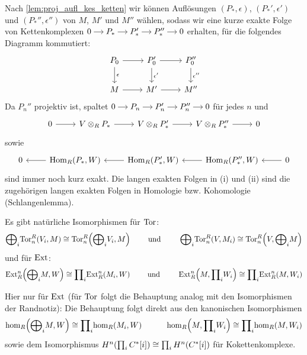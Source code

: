 \begin{beweis}
	Nach \autoref{lem:proj_aufl_kes_ketten} wir können Auflösungen $(P_*,\epsilon)$, $(P_*',\epsilon')$ und $(P_*'',\epsilon'')$ von $M$, $M'$ und $M''$ wählen, sodass wir eine kurze exakte Folge von Kettenkomplexen
	\(
		\begin{tikzcd}[cramped,sep=small]
			0 \rar & P_* \rar & P_*' \rar & P_*'' \rar & 0
		\end{tikzcd}
	\)
	erhalten, für die folgendes Diagramm kommutiert: 
	\[
		\begin{tikzcd}
			P_0 \rar \dar["\epsilon"] & P_0' \dar["\epsilon'"] \rar & P_0'' \dar["\epsilon''"] \\
			M \rar & M' \rar & M''
		\end{tikzcd}
	\]
	Da $P_n''$ projektiv ist, spaltet 
	\(
		\begin{tikzcd}[cramped,sep=small]
			0 \rar & P_n \rar & P_n' \rar & P_n'' \rar & 0
		\end{tikzcd}
	\)
	für jedes $n$ und
	\[
		\begin{tikzcd}
			0 \rar & V \otimes_R P_* \rar & V \otimes_R P_*' \rar & V \otimes_R P_*'' \rar &0
		\end{tikzcd}
	\]
	sowie
	\[
		\begin{tikzcd}
			0 & \Hom_R(P_*,W) \lar & \Hom_R(P_*',W) \lar & \Hom_R(P_*'',W) \lar & 0 \lar
		\end{tikzcd}
	\]
	sind immer noch kurz exakt. 
	Die langen exakten Folgen in (i) und (ii) sind die zugehörigen langen exakten Folgen in Homologie bzw. Kohomologie (Schlangenlemma).
\end{beweis}

\begin{bemerkung}[{name=[{Verträglichkeit von Tor und Ext mit (Ko)-Produkten}]}]
	Es gibt natürliche Isomorphismen für $\operatorname{Tor}$:
	\[
		\bigoplus\nolimits_{i}\! \Tor_n^R(V_i,M) \cong \Tor_n^R \enbrace*{\bigoplus\nolimits_{i}\! V_i, M} \qquad \text{ und } \qquad 
		\bigoplus\nolimits_{i} \!\Tor_n^R(V,M_i) \cong \Tor_n^R \enbrace*{V, \bigoplus\nolimits_{i}\! M} 
	\]
	und für $\operatorname{Ext}$:
	\[
		\Ext_R^n \enbrace*{\bigoplus\nolimits_{i}\! M,W} \cong \prod\nolimits_{i} \!\Ext_R^n(M_i,W) \qquad \text{ und } \qquad \Ext_R^n \enbrace*{M, \prod\nolimits_{i} \!W_i} \cong \prod\nolimits_{i}\! \Ext_R^n(M,W_i) 
	\]
\end{bemerkung}
\begin{beweis}
	Hier nur für $\operatorname{Ext}$ (für $\operatorname{Tor}$ folgt die Behauptung analog mit den Isomorphismen der Randnotiz):
	Die Behauptung folgt direkt aus den kanonischen Isomorphismen
	\[
		\hom_R\enbrace*{\bigoplus\nolimits_{i}\!M,W} \cong \prod\nolimits_i \!\hom_R(M_i,W) \qquad \quad 
		\hom_R\enbrace*{M, \prod\nolimits_{i} \!W_i} \cong \prod\nolimits_i \!\hom_R(M,W_i) 
	\]
	sowie dem Isomorphismus $H^n \enbrace*{\prod_i C^*[i]} \cong \prod_i H^n \enbrace*{C^*[i]}$ für Kokettenkomplexe.
\end{beweis}

